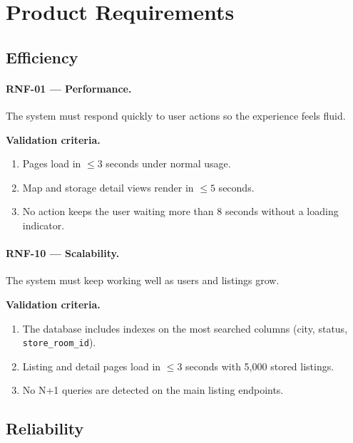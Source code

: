 \documentclass[11pt,a4paper,oneside]{report}
\begin{document}
\section{Product Requirements}

\subsection{Efficiency}
\label{nfr:efficiency}

\paragraph{RNF-01 --- Performance.} \label{req:RNF-01}
The system must respond quickly to user actions so the experience feels fluid.

\textbf{Validation criteria.}
\begin{enumerate}
\item Pages load in $\leq 3$ seconds under normal usage.
\item Map and storage detail views render in $\leq 5$ seconds.
\item No action keeps the user waiting more than 8 seconds without a loading indicator.
\end{enumerate}

\paragraph{RNF-10 --- Scalability.} \label{req:RNF-10}
The system must keep working well as users and listings grow.

\textbf{Validation criteria.}
\begin{enumerate}
\item The database includes indexes on the most searched columns (city, status, \texttt{store\_room\_id}).
\item Listing and detail pages load in $\leq 3$ seconds with 5,000 stored listings.
\item No N+1 queries are detected on the main listing endpoints.
\end{enumerate}

\subsection{Reliability}
\label{nfr:reliability}
\end{document}
